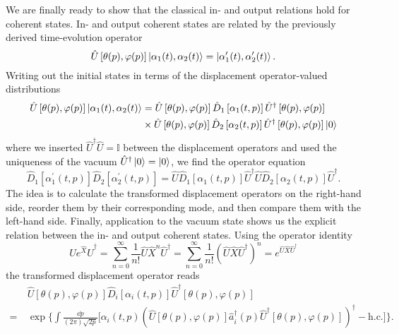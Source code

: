 We are finally ready to show that the classical in- and output relations hold for coherent states.
In- and output coherent states are related by the previously derived time-evolution operator
\begin{equation}
	\hat{U}\left[\theta(p),\varphi(p)\right]
	\ket{\alpha_1(t),\alpha_2(t)}
	=
	\ket{\alpha_1^\prime(t),\alpha_2^\prime(t)}
	.
\end{equation}
Writing out the initial states in terms of the displacement operator-valued distributions
\begin{equation}
	\begin{split}
		\hat{U}\left[\theta(p),\varphi(p)\right]
		\ket{\alpha_1(t),\alpha_2(t)}
		&=
		\hat{U}\left[\theta(p),\varphi(p)\right]
		\hat{D}_1\left[\alpha_1(t,p)\right]
		\hat{U}^\dagger\left[\theta(p),\varphi(p)\right]
		\\
		&\times
		\hat{U}\left[\theta(p),\varphi(p)\right]
		\hat{D}_2\left[\alpha_2(t,p)\right]
		\hat{U}^\dagger\left[\theta(p),\varphi(p)\right]
		\ket{0}
	\end{split}
\end{equation}
where we inserted $\hat{U}^\dagger\hat{U}=\mathbb{I}$ between the displacement operators and used the uniqueness of the vacuum $\hat{U}^\dagger\ket{0}=\ket{0}$, we find the operator equation
\begin{equation}
	\hat{D}_1\left[\alpha_1^\prime(t,p)\right]
	\hat{D}_2\left[\alpha_2^\prime(t,p)\right]
	=
	\hat{U}
	\hat{D}_1\left[\alpha_1(t,p)\right]
	\hat{U}^\dagger
	\hat{U}
	\hat{D}_2\left[\alpha_2(t,p)\right]
	\hat{U}^\dagger
	.
\end{equation}
The idea is to calculate the transformed displacement operators on the right-hand side, reorder them by their corresponding mode, and then compare them with the left-hand side.
Finally, application to the vacuum state shows us the explicit relation between the in- and output coherent states.
Using the operator identity
\begin{equation}
	\hat{U}
	e^{\hat{X}}
	\hat{U}^\dagger
	=
	\sum_{n=0}^\infty
	\frac{1}{n!}
	\hat{U}
	\hat{X}^n
	\hat{U}^\dagger
	=
	\sum_{n=0}^\infty
	\frac{1}{n!}
	\left(
		\hat{U}
		\hat{X}
		\hat{U}^\dagger
	\right)^n
	=
	e^{\hat{U}\hat{X}\hat{U}^\dagger}
\end{equation}
the transformed displacement operator reads
\begin{equation}
	\begin{split}
		&\
		\hat{U}\left[\theta(p),\varphi(p)\right]
		\hat{D}_i\left[\alpha_i(t,p)\right]
		\hat{U}^\dagger\left[\theta(p),\varphi(p)\right]
		\\
		=&\
		\exp\biggl\{
			\int\frac{\dd{p}}{(2\pi)\sqrt{2p}}
			\bigl[
				\alpha_i(t,p)
				\left(
					\hat{U}\left[\theta(p),\varphi(p)\right]
					\hat{a}_i^\dagger(p)
					\hat{U}^\dagger\left[\theta(p),\varphi(p)\right]
				\right)^\dagger
				-
				\text{h.c.}
			\bigr]
		\biggr\}
		.
	\end{split}
\end{equation}
